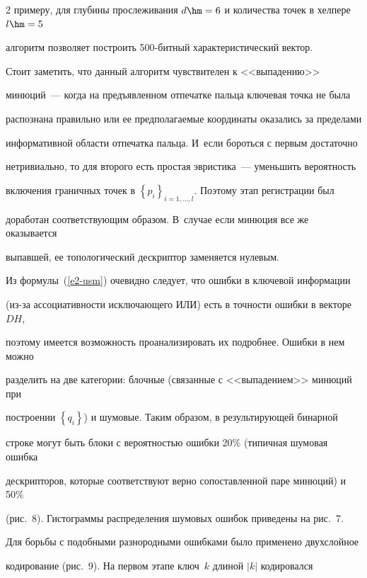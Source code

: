 \begin{multicols}{2}
примеру, для глубины прослеживания $d \hm= 6$ и количества точек в хелпере $l \hm= 5$ 

алгоритм позволяет построить 500-бит\-ный характеристический вектор.

      



      

      Стоит заметить, что данный алгоритм чувствителен к <<выпадению>> 

      минюций~--- когда на предъявленном отпечатке пальца ключевая точка не была 

распознана правильно или ее предполагаемые координаты оказались за пределами 

информативной области отпечатка пальца. И~если бороться с первым достаточно 

нетривиально, то для второго есть простая эвристика~--- уменьшить вероятность 

включения граничных точек в $\left\{p_i\right\}_{i=1,\ldots ,l}$. Поэтому этап регистрации был 

доработан соответствующим образом. В~случае если минюция все же оказывается 

выпавшей, ее топологический дескриптор заменяется нулевым.

      

      Из формулы~(\ref{e2-usm}) очевидно следует, что ошибки в ключевой информации 

(из-за ассоциативности исключающего ИЛИ) есть в точности ошибки в векторе~$DH$, 

поэтому имеется возможность проанализировать их подробнее. Ошибки в нем можно 

разделить на две категории: блочные (связанные с <<выпадением>> минюций при 

построении $\left\{q_i\right\}$) и шумовые. Таким образом, в результирующей бинарной 

строке могут быть блоки с вероятностью ошибки 20\% (типичная шумовая ошибка 

дескрипторов, которые соответствуют верно сопоставленной паре минюций) и 50\% 

(рис.~8). Гистограммы распределения шумовых ошибок приведены на рис.~7.

      

      Для борьбы с подобными разнородными ошибками было применено двухслойное 

кодирование (рис.~9). На первом этапе ключ~$k$ длиной $\vert k\vert$ кодировался 


\end{multicols}
